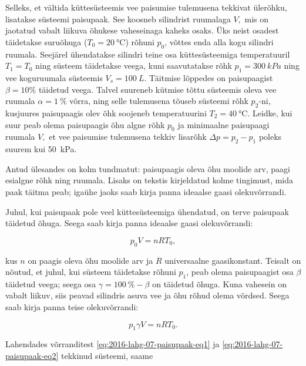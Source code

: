 
Selleks, et vältida küttesüsteemis vee paisumise tulemusena tekkivat
ülerõhku, lisatakse süsteemi paisupaak. See koosneb silindrist ruumalaga
$V,$ mis on jaotatud vabalt liikuva õhukese vaheseinaga kaheks osaks. Üks
neist osadest täidetakse suruõhuga ($T_{0}=\SI{20}{\degreeCelsius}$)
rõhuni $p_{0}$, võttes enda alla kogu silindri ruumala. Seejärel ühendatakse silindri teine osa küttesüsteemiga temperatuuril $T_{1}=T_{0}$ ning süsteem täidetakse
veega, kuni saavutatakse rõhk $p_{1}=\SI{300}{kPa}$ ning vee koguruumala süsteemis $V_{s}=\SI{100}{L}$.
Täitmise lõppedes on paisupaagist $\beta=10\%$ täidetud veega. Talvel suureneb kütmise tõttu süsteemis oleva vee ruumala $\alpha=\SI{1}{\%}$ võrra, ning selle tulemusena tõuseb süsteemi rõhk $p_{2}$-ni, kusjuures paisupaagis olev õhk soojeneb temperatuurini $T_{2}=\SI{40}{\degreeCelsius}$. Leidke, kui suur peab olema paisupaagis
õhu algne rõhk $p_{0}$ ja minimaalne paisupaagi ruumala $V,$
et vee paisumise tulemusena tekkiv lisarõhk $\Delta p=p_{2}-p_{1}$
poleks suurem kui \SI{50}{kPa}. 

\hint
Antud ülesandes on kolm tundmatut: paisupaagis oleva õhu moolide arv, paagi esialgne rõhk ning ruumala. Lisaks on tekstis kirjeldatud kolme tingimust, mida paak täitma peab; igaühe jaoks saab kirja panna ideaalse gaasi olekuvõrrandi.

\solu
Juhul, kui paisupaak pole veel küttesüsteemiga ühendatud, on terve
paisupaak täidetud õhuga. Seega saab kirja panna ideaalse gaasi olekuvõrrandi:

\begin{equation}
p_{0}V=nRT_{0},\label{eq:2016-lahg-07-paisupaak-eq1}
\end{equation}

\noindent kus $n$ on paagis oleva õhu moolide arv ja $R$ universaalne
gaasikonstant. Teisalt on nõutud, et juhul, kui süsteem täidetakse
rõhuni $p_{1}$, peab olema paisupaagist osa $\beta$ täidetud veega;
seega osa $\gamma=\SI{100}{\%}-\beta$ on täidetud õhuga. Kuna vahesein
on vabalt liikuv, siis peavad silindris asuva vee ja õhu rõhud olema
võrdsed. Seega saab kirja panna teise olekuvõrrandi:

\begin{equation}
p_{1}\gamma V=nRT_{0}.\label{eq:2016-lahg-07-paisupaak-eq2}
\end{equation}


\noindent Lahendades võrranditest \eqref{eq:2016-lahg-07-paisupaak-eq1} ja \eqref{eq:2016-lahg-07-paisupaak-eq2} tekkinud süsteemi, saame

